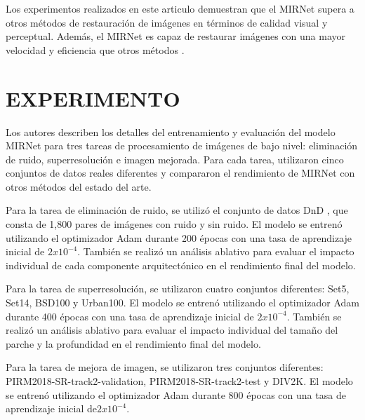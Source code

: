 \documentclass[a4paper,
               ]{jacow}
\begin{document}
Los experimentos realizados en este articulo demuestran que el MIRNet supera a otros métodos de restauración de imágenes en términos de calidad visual y perceptual. Además, el MIRNet es capaz de restaurar imágenes con una mayor velocidad y eficiencia que otros métodos \cite{tian2020learning}.


%
\section{EXPERIMENTO}
Los autores describen los detalles del entrenamiento y evaluación del modelo MIRNet para tres tareas de procesamiento de imágenes de bajo nivel: eliminación de ruido, superresolución e imagen mejorada. Para cada tarea, utilizaron cinco conjuntos de datos reales diferentes y compararon el rendimiento de MIRNet con otros métodos del estado del arte.

Para la tarea de eliminación de ruido, se utilizó el conjunto de datos DnD \cite{dnd}, que consta de 1,800 pares de imágenes con ruido y sin ruido. El modelo se entrenó utilizando el optimizador Adam durante 200 épocas con una tasa de aprendizaje inicial de $2x10^{-4}$. También se realizó un análisis ablativo para evaluar el impacto individual de cada componente arquitectónico en el rendimiento final del modelo.

Para la tarea de superresolución, se utilizaron cuatro conjuntos diferentes: Set5, Set14, BSD100 y Urban100. El modelo se entrenó utilizando el optimizador Adam durante 400 épocas con una tasa de aprendizaje inicial de $2x10^{-4}$. También se realizó un análisis ablativo para evaluar el impacto individual del tamaño del parche y la profundidad en el rendimiento final del modelo.

Para la tarea de mejora de imagen, se utilizaron tres conjuntos diferentes: PIRM2018-SR-track2-validation, PIRM2018-SR-track2-test y DIV2K. El modelo se entrenó utilizando el optimizador Adam durante 800 épocas con una tasa de aprendizaje inicial de$2x10^{-4}$.
\end{document}

